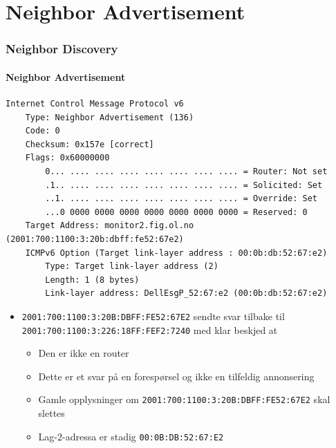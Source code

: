 \section{Neighbor Advertisement}
\begin{frame}[fragile]%
  \frametitle{Neighbor Discovery}
  \framesubtitle{Neighbor Advertisement}
  \pause
\begin{Verbatim}[fontsize=\tiny]
Internet Control Message Protocol v6
    Type: Neighbor Advertisement (136)
    Code: 0
    Checksum: 0x157e [correct]
    Flags: 0x60000000
        0... .... .... .... .... .... .... .... = Router: Not set
        .1.. .... .... .... .... .... .... .... = Solicited: Set
        ..1. .... .... .... .... .... .... .... = Override: Set
        ...0 0000 0000 0000 0000 0000 0000 0000 = Reserved: 0
    Target Address: monitor2.fig.ol.no (2001:700:1100:3:20b:dbff:fe52:67e2)
    ICMPv6 Option (Target link-layer address : 00:0b:db:52:67:e2)
        Type: Target link-layer address (2)
        Length: 1 (8 bytes)
        Link-layer address: DellEsgP_52:67:e2 (00:0b:db:52:67:e2)
\end{Verbatim}
  \pause
  \begin{itemize}[<+->]
  \item \texttt{2001:700:1100:3:20B:DBFF:FE52:67E2} sendte svar
    tilbake til \texttt{2001:700:1100:3:226:18FF:FEF2:7240} med klar beskjed at
    \begin{itemize}[<+->]
    \item Den er ikke en router
    \item Dette er et svar på en forespørsel og ikke en tilfeldig annonsering
    \item Gamle opplysninger om \texttt{2001:700:1100:3:20B:DBFF:FE52:67E2} skal slettes
    \item Lag-2-adressa er stadig \texttt{00:0B:DB:52:67:E2}
    \end{itemize}
  \end{itemize}
\end{frame}

